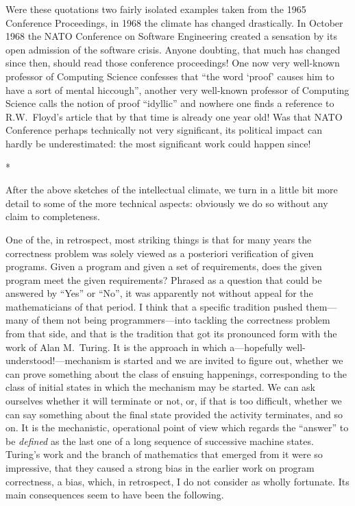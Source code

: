 \documentclass[12pt,letterpaper]{article}
\newcommand{\acro}[1]{{\small\MakeUppercase{#1}\spacefactor1000}}
\newcommand{\stardiv}{\medskip\centerline{*\qquad\raisebox{-1ex}{*}\qquad*}\medskip\noindent\ignorespaces}
\begin{document}
Were these quotations two fairly isolated examples taken from the 1965
Conference Proceedings, in 1968 the climate has changed drastically. In October
1968 the \acro{NATO} Conference on Software Engineering created a sensation by
its open admission of the software crisis. Anyone doubting, that much has
changed since then, should read those conference proceedings! One now very
well-known professor of Computing Science confesses that ``the word `proof'
causes him to have a sort of mental hiccough'', another very well-known
professor of Computing Science calls the notion of proof ``idyllic'' and
nowhere one finds a reference to R.W.~Floyd's article that by that time is
already one year old! Was that \acro{NATO} Conference perhaps technically not
very significant, its political impact can hardly be underestimated: the most
significant work could happen since! 

\stardiv

After the above sketches of the intellectual climate, we turn in a little bit more detail 
to some of the more technical aspects: obviously 
we do so without any claim to completeness. 

One of the, in retrospect, most striking things is that for many years the
correctness problem was solely viewed as a posteriori verification of given
programs. Given a program and given a set of requirements, does the given
program meet the given requirements? Phrased as a question that could be
answered by ``Yes'' or ``No'', it was apparently not without appeal for the
mathematicians of that period. I think that a specific tradition pushed
them---many of them not being programmers---into tackling the correctness
problem from that side, and that is the tradition that got its pronounced form
with the work of Alan M.~Turing. It is the approach in which a---hopefully
well-understood!---mechanism is started and we are invited to figure out,
whether we can prove something about the class of ensuing happenings,
corresponding to the class of initial states in which the mechanism may be
started. We can ask ourselves whether it will terminate or not, or, if that is
too difficult, whether we can say something about the final state provided the
activity terminates, and so on. It is the mechanistic, operational point of
view which regards the ``answer'' to be \emph{defined} as the last one of a
long sequence of successive machine states. Turing's work and the branch of
mathematics that emerged from it were so impressive, that they caused a strong
bias in the earlier work on program correctness, a bias, which, in retrospect,
I do not consider as wholly fortunate. Its main consequences seem to have been
the following. 
\end{document}
